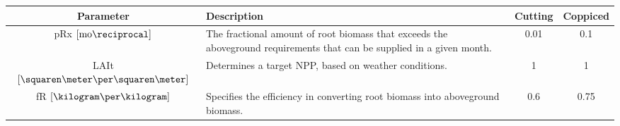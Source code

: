 \begin{tabularx}{\linewidth}{|c|X|c|c|}
  \hline
  Parameter & Description & Cutting & Coppiced\\
\hline
pRx $[\unit{mo}\reciprocal]$ & The fractional amount of root biomass that exceeds the aboveground requirements that can be supplied in a given month. & 0.01 & 0.1\\
\ac{LAIt} $[\squaren\meter\per\squaren\meter]$ & Determines a target \ac{NPP}, based on weather conditions. & 1 & 1\\
\ac{fR} $[\kilogram\per\kilogram]$ & Specifies the efficiency in converting root biomass into aboveground biomass. & 0.6 & 0.75\\
\hline
\end{tabularx}

